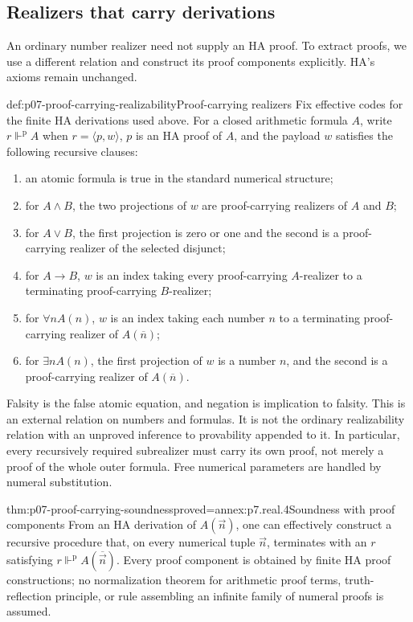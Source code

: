 \subsection{Realizers that carry derivations}
\label{sec:p07-proof-carrying-realizability}

An ordinary number realizer need not supply an HA proof. To extract
proofs, we use a different relation and construct its proof components
explicitly. HA's axioms remain unchanged.

\begin{hbdefinition}{def:p07-proof-carrying-realizability}{Proof-carrying realizers}
Fix effective codes for the finite HA derivations used above. For a
closed arithmetic formula \(A\), write \(r\Vdash^{\mathrm p}A\)
when \(r=\langle p,w\rangle\), \(p\) is an HA proof of \(A\),
and the payload \(w\) satisfies the following recursive clauses:
\begin{enumerate}
\item an atomic formula is true in the standard numerical structure;
\item for \(A\land B\), the two projections of \(w\) are
      proof-carrying realizers of \(A\) and \(B\);
\item for \(A\lor B\), the first projection is zero or one and
      the second is a proof-carrying realizer of the selected disjunct;
\item for \(A\to B\), \(w\) is an index taking every
      proof-carrying \(A\)-realizer to a terminating
      proof-carrying \(B\)-realizer;
\item for \(\forall nA(n)\), \(w\) is an index taking each number
      \(n\) to a terminating proof-carrying realizer of
      \(A(\overline n)\);
\item for \(\exists nA(n)\), the first projection of \(w\) is a
      number \(n\), and the second is a proof-carrying realizer of
      \(A(\overline n)\).
\end{enumerate}
Falsity is the false atomic equation, and negation is implication to
falsity. This is an external relation on numbers and formulas. It is
not the ordinary realizability relation with an unproved inference to
provability appended to it. In particular, every recursively required
subrealizer must carry its own proof, not merely a proof of the whole
outer formula. Free numerical parameters are handled by numeral
substitution.
\end{hbdefinition}

\begin{hbtheorem}{thm:p07-proof-carrying-soundness}{proved=annex:p7.real.4}{Soundness with proof components}
From an HA derivation of \(A(\vec n)\), one can effectively construct
a recursive procedure that, on every numerical tuple \(\vec n\),
terminates with an \(r\) satisfying
\(r\Vdash^{\mathrm p}A(\overline{\vec n})\).
Every proof component is obtained by finite HA proof constructions;
no normalization theorem for arithmetic proof terms, truth-reflection
principle, or rule assembling an infinite family of numeral proofs is
assumed.
\end{hbtheorem}
